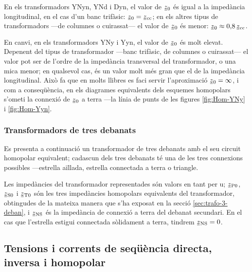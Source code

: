 En els  transformadors YNyn, YNd i Dyn, el valor de $\cmplx{z}_0$ és igual a la impedància longitudinal, en el cas d'un banc trifàsic: $\cmplx{z}_0=\cmplx{z}\ped{cc}$; en els altres tipus de transformadors ---de columnes o cuirassat--- el valor de $\cmplx{z}_0$ és menor: $\cmplx{z}_0\approx 0{,}8\, \cmplx{z}\ped{cc}$.

En canvi, en els transformadors YNy i Yyn, el valor de $\cmplx{z}_0$ és molt elevat. Depenent del tipus de transformador ---banc trifàsic, de columnes o cuirassat--- el valor pot ser de l'ordre de la impedància transversal del transformador, o una mica menor; en qualsevol cas, és un valor molt més gran que el de la impedància longitudinal. Això fa que en molts llibres es faci servir l'aproximació $\cmplx{z}_0 = \infty$, i com a conseqüència, en els diagrames equivalents dels esquemes homopolars s'ometi la connexió de $\cmplx{z}_0$ a terra ---la línia de punts de les figures \ref{fig:Hom-YNy} i \ref{fig:Hom-Yyn}.

\subsubsection{Transformadors de tres debanats}\label{sec:cir-hom-3-deb}

Es presenta a continuació un transformador de tres debanats amb el seu circuit homopolar equivalent; cadascun dels tres debanats té una de les tres connexions possibles ---estrella aïllada, estrella connectada a terra o triangle.

Les impedàncies del transformador representades són valors en tant per u; $\cmplx{z}\ped{P0}$, $\cmplx{z}\ped{S0}$ i $\cmplx{z}\ped{T0}$ són les tres impedàncies homopolars equivalents del transformador, obtingudes de la mateixa manera que s'ha exposat en la secció \ref{sec:trafo-3-deban}, i $\cmplx{z}\ped{NS}$ és  la impedància de connexió a terra del debanat secundari. En el cas que l'estrella estigui connectada sòlidament a terra, tindrem $\cmplx{z}\ped{NS}=0$.

\begin{center}
    
\end{center}


\subsection{Tensions i corrents de seqüència directa, inversa i homopolar}


